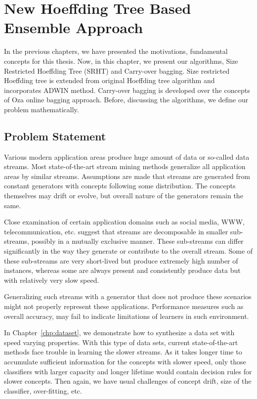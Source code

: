 \chapter{New Hoeffding Tree Based Ensemble Approach}
\label{chp:algo}
In the previous chapters, we have presented the motivations, fundamental concepts for this thesis. Now, in this chapter, we present our algorithms, Size Restricted Hoeffding Tree (SRHT) and Carry-over bagging. Size restricted Hoeffding tree is extended from original Hoeffding tree algorithm and incorporates ADWIN method. Carry-over bagging is developed over the concepts of Oza online bagging approach. 
Before, discussing the algorithms, we define our problem mathematically. 

\section{Problem Statement}
Various modern application areas produce huge amount of data or so-called data streams. Most state-of-the-art stream mining methods generalize all application areas by similar streams. Assumptions are made that streams are generated from constant generators with concepts following some distribution. The concepts themselves may drift or evolve, but overall nature of the generators remain the same.

Close examination of certain application domains such as social media, WWW, telecommunication, etc. suggest that streams are decomposable in smaller sub-streams, possibly in a mutually exclusive manner. These sub-streams  can differ significantly in the way they generate or contribute to the overall stream. Some of these sub-streams are very short-lived but produce extremely high number of instances, whereas some are always present and consistently produce data but with relatively very slow speed.

Generalizing such streams with a generator that does not produce these scenarios might not properly represent these applications. Performance measures such as overall accuracy, may fail to indicate limitations of learners in such environment.

In Chapter~\ref{chp:dataset}, we demonstrate how to synthesize a data set with speed varying properties. With this type of data sets, current state-of-the-art methods face trouble in learning the slower streams. As it takes longer time to accumulate sufficient information for the concepts with slower speed, only those classifiers with larger capacity and longer lifetime would contain decision rules for slower concepts. Then again, we have usual challenges of concept drift, size of the classifier, over-fitting, etc.

